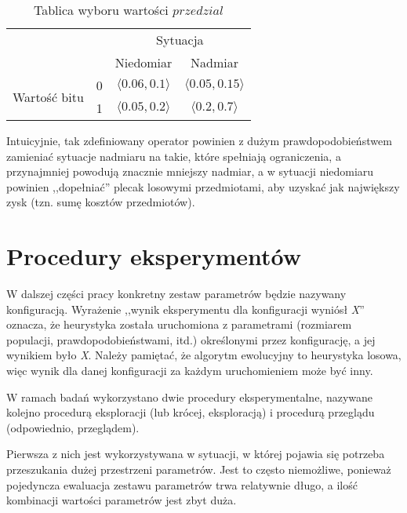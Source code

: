 \documentclass[twoside]{iisthesis}
\newcommand{\range}[2]{\langle#1, #2\rangle}
\begin{document}
\begin{table}
	\caption{Tablica wyboru wartości $przedzial$ \label{table:range_choose}}
	\centering
	\begin{tabular}{cc|c|c|}
		\cline{3-4}
		\multicolumn{2}{c|}{\multirow{2}{*}{}}                   & \multicolumn{2}{c|}{Sytuacja}              \\ \cline{3-4} 
		\multicolumn{2}{c|}{}                                    & Niedomiar           & Nadmiar              \\ \hline
		\multicolumn{1}{|c|}{\multirow{2}{*}{Wartość bitu}} & 0 & $\range{0.06}{0.1}$ & $\range{0.05}{0.15}$ \\ \cline{2-4} 
		\multicolumn{1}{|c|}{}                              & 1 & $\range{0.05}{0.2}$ & $\range{0.2}{0.7}$   \\ \hline
	\end{tabular}
\end{table}

Intuicyjnie, tak zdefiniowany operator powinien z dużym prawdopodobieństwem zamieniać sytuacje nadmiaru na takie, które spełniają ograniczenia, a przynajmniej powodują znacznie mniejszy nadmiar, a w sytuacji niedomiaru powinien ,,dopełniać'' plecak losowymi przedmiotami, aby uzyskać jak największy zysk (tzn. sumę kosztów przedmiotów).


\section{Procedury eksperymentów}

W dalszej części pracy konkretny zestaw parametrów będzie nazywany konfiguracją.
Wyrażenie ,,wynik eksperymentu dla konfiguracji wyniósł \emph{X}'' oznacza, że heurystyka została uruchomiona z parametrami (rozmiarem populacji, prawdopodobieństwami, itd.) określonymi przez konfigurację, a jej wynikiem było \emph{X}.
Należy pamiętać, że algorytm ewolucyjny to heurystyka losowa, więc wynik dla danej konfiguracji za każdym uruchomieniem może być inny.

W ramach badań wykorzystano dwie procedury eksperymentalne, nazywane kolejno procedurą eksploracji (lub krócej, eksploracją) i procedurą przeglądu (odpowiednio, przeglądem).

Pierwsza z nich jest wykorzystywana w sytuacji, w której pojawia się potrzeba przeszukania dużej przestrzeni parametrów.
Jest to często niemożliwe, ponieważ pojedyncza ewaluacja zestawu parametrów trwa relatywnie długo, a ilość kombinacji wartości parametrów jest zbyt duża.
\end{document}

